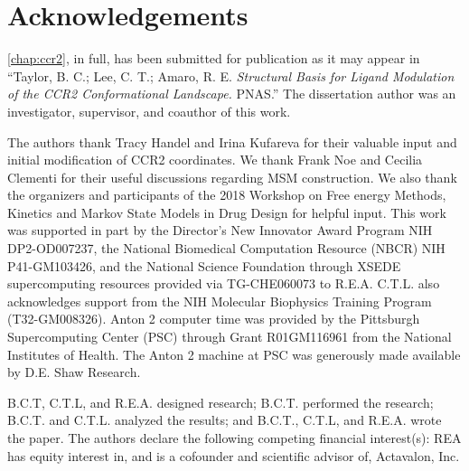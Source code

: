 \section{Acknowledgements}

\par \cref{chap:ccr2}, in full, has been submitted for publication as it may appear in ``Taylor, B. C.; Lee, C. T.; Amaro, R. E. \emph{Structural Basis for Ligand Modulation of the CCR2 Conformational Landscape.} PNAS.''
The dissertation author was an investigator, supervisor, and coauthor of this work.

\par The authors thank Tracy Handel and Irina Kufareva for their valuable input and initial modification of CCR2 coordinates.
We thank Frank Noe and Cecilia Clementi for their useful discussions regarding MSM construction.
We also thank the organizers and participants of the 2018 Workshop on Free energy Methods, Kinetics and Markov State Models in Drug Design for helpful input.
This work was supported in part by the Director's New Innovator Award Program NIH DP2-OD007237, the National Biomedical Computation Resource (NBCR) NIH P41-GM103426, and the National Science Foundation through XSEDE supercomputing resources provided via TG-CHE060073 to R.E.A.
C.T.L. also acknowledges support from the NIH Molecular Biophysics Training Program (T32-GM008326).
Anton 2 computer time was provided by the Pittsburgh Supercomputing Center (PSC) through Grant R01GM116961 from the National Institutes of Health. The Anton 2 machine at PSC was generously made available by D.E. Shaw Research.

\par B.C.T, C.T.L, and R.E.A. designed research; B.C.T. performed the research; B.C.T. and C.T.L. analyzed the results; and B.C.T., C.T.L, and R.E.A. wrote the paper. The authors declare the following competing financial interest(s): REA has equity interest in, and is a cofounder and scientific advisor of, Actavalon, Inc.